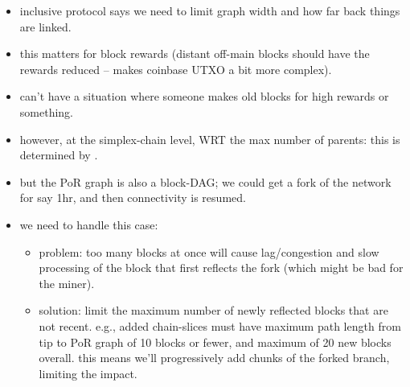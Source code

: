 \begin{draftonly}


\begin{itemize}
    \item inclusive protocol says we need to limit graph width and how far back things are linked.
    \item this matters for block rewards (distant off-main blocks should have the rewards reduced -- makes coinbase UTXO a bit more complex).
    \item can't have a situation where someone makes old blocks for high rewards or something.
    \item however, at the simplex-chain level, WRT the max number of parents: this is determined by \AxiomOfUnifiedAncestry.
    \item but the PoR graph is also a block-DAG; we could get a fork of the network for say 1hr, and then connectivity is resumed.
    \item we need to handle this case:
    \begin{itemize}
        \item problem: too many blocks at once will cause lag/congestion and slow processing of the block that first reflects the fork (which might be bad for the miner).
        \item solution: limit the maximum number of newly reflected blocks that are not recent.
        e.g., added chain-slices must have maximum path length from tip to PoR graph of 10 blocks or fewer, and maximum of 20 new blocks overall.
        this means we'll progressively add chunks of the forked branch, limiting the impact.
    \end{itemize}
\end{itemize}

\end{draftonly}






